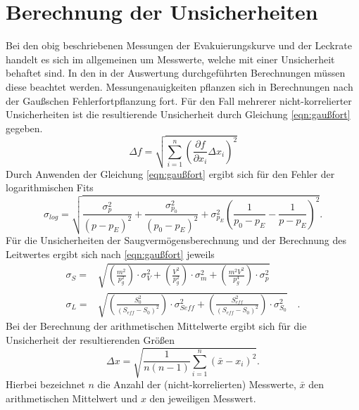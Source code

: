 \section{Berechnung der Unsicherheiten}
\label{sec:unsicherheiten}
Bei den obig beschriebenen Messungen der Evakuierungskurve und der Leckrate handelt es sich
im allgemeinen um Messwerte, welche mit einer Unsicherheit behaftet sind. In den in der
Auswertung durchgeführten Berechnungen müssen diese beachtet werden. Messungenauigkeiten
pflanzen sich in Berechnungen nach der Gaußschen Fehlerfortpflanzung fort. Für den Fall mehrerer
nicht-korrelierter Unsicherheiten ist die resultierende Unsicherheit durch Gleichung \ref{eqn:gaußfort}
gegeben.
\begin{equation}
  \Delta f = \sqrt{\sum_{i=1}^{n} \left( \frac{\partial f}{\partial x_{i}} \Delta x_{i} \right)^{2}}
 \label{eqn:gaußfort}
\end{equation}
Durch Anwenden der Gleichung \ref{eqn:gaußfort} ergibt sich für den Fehler der logarithmischen Fits
\begin{equation*}
  \sigma_{log} = \sqrt{\frac{\sigma_p^2}{(p-p_E)^2}+\frac{\sigma_{p_{0}}^2}{(p_0-p_E)^2}+\sigma_{p_E}^2 \left(\frac{1}{p_0-p_E}-\frac{1}{p-p_E}\right)^2}.
\end{equation*}
Für die Unsicherheiten der Saugvermögensberechnung und der Berechnung des Leitwertes ergibt sich nach
\ref{eqn:gaußfort} jeweils
\begin{align*}
  \sigma_{S} = & \sqrt{\left(\frac{m^2}{p_g^2}\right) \cdot \sigma_{V}^2 + \left(\frac{V^2}{p_g^2}\right) \cdot \sigma_m^2 + \left(\frac{m^2 V^2}{p_g^4}\right) \cdot \sigma_p^2} \\
  \sigma_{L} = & \sqrt{\left( \frac{ S_0^2}{(S_{eff}- S_0)^2} \right) \cdot \sigma_{Seff}^2 + \left( \frac{S_{eff}^2}{(S_{eff}- S_0)^2} \right) \cdot \sigma_{S_{0}}^2} \quad.
\end{align*}
Bei der Berechnung der arithmetischen Mittelwerte ergibt sich für die Unsicherheit der resultierenden
Größen
\begin{equation}
 \Delta x = \sqrt{\frac{1}{n(n-1)} \sum_{i=1}^{n} (\bar{x} - x_{i})^{2}}.
\end{equation}
Hierbei bezeichnet $n$ die Anzahl der (nicht-korrelierten) Messwerte, $\bar{x}$ den arithmetischen Mittelwert
und $x$ den jeweiligen Messwert.
